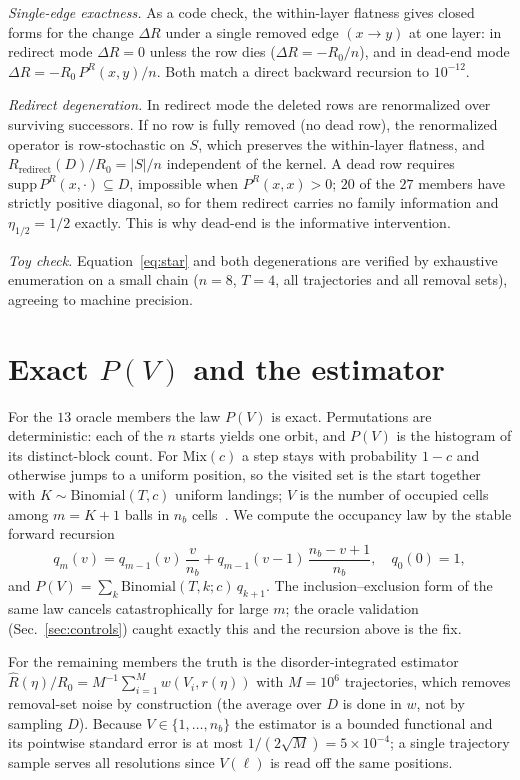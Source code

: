 \documentclass[aps,pre,twocolumn,superscriptaddress,floatfix,longbibliography]{revtex4-2}
\begin{document}
\emph{Single-edge exactness.} As a code check, the within-layer flatness gives closed
forms for the change $\Delta R$ under a single removed edge $(x\to y)$ at one layer:
in redirect mode $\Delta R=0$ unless the row dies ($\Delta R=-R_0/n$), and in
dead-end mode $\Delta R=-R_0\,P^R(x,y)/n$. Both match a direct backward recursion to
$10^{-12}$.

\emph{Redirect degeneration.} In redirect mode the deleted rows are renormalized over
surviving successors. If no row is fully removed (no dead row), the renormalized
operator is row-stochastic on $S$, which preserves the within-layer flatness, and
$R_{\mathrm{redirect}}(D)/R_0=|S|/n$ independent of the kernel. A dead row requires
$\mathrm{supp}\,P^R(x,\cdot)\subseteq D$, impossible when $P^R(x,x)>0$; $20$ of the
$27$ members have strictly positive diagonal, so for them redirect carries no family
information and $\eta_{1/2}=1/2$ exactly. This is why dead-end is the informative
intervention.

\emph{Toy check.} Equation~\eqref{eq:star} and both degenerations are verified by
exhaustive enumeration on a small chain ($n=8$, $T=4$, all trajectories and all
removal sets), agreeing to machine precision.

\section{Exact \texorpdfstring{$P(V)$}{P(V)} and the estimator}
\label{app:pv}

For the $13$ oracle members the law $P(V)$ is exact. Permutations are deterministic:
each of the $n$ starts yields one orbit, and $P(V)$ is the histogram of its
distinct-block count. For $\mathrm{Mix}(c)$ a step stays with probability $1-c$ and
otherwise jumps to a uniform position, so the visited set is the start together with
$K\sim\mathrm{Binomial}(T,c)$ uniform landings; $V$ is the number of occupied cells
among $m=K+1$ balls in $n_b$ cells~\cite{Feller1968}. We compute the occupancy law by
the stable forward recursion
\begin{equation}
q_m(v)=q_{m-1}(v)\,\frac{v}{n_b}+q_{m-1}(v-1)\,\frac{n_b-v+1}{n_b},\quad q_0(0)=1,
\end{equation}
and $P(V)=\sum_k \mathrm{Binomial}(T,k;c)\,q_{k+1}$. The inclusion--exclusion form of
the same law cancels catastrophically for large $m$; the oracle validation
(Sec.~\ref{sec:controls}) caught exactly this and the recursion above is the fix.

For the remaining members the truth is the disorder-integrated estimator
$\hat R(\eta)/R_0=M^{-1}\sum_{i=1}^{M} w(V_i,r(\eta))$ with $M=10^{6}$ trajectories,
which removes removal-set noise by construction (the average over $D$ is done in
$w$, not by sampling $D$). Because $V\in\{1,\dots,n_b\}$ the estimator is a bounded
functional and its pointwise standard error is at most $1/(2\sqrt{M})=5\times10^{-4}$;
a single trajectory sample serves all resolutions since $V(\ell)$ is read off the
same positions.
\end{document}
